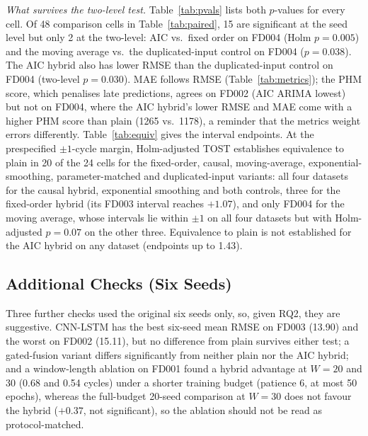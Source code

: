 \documentclass[conference]{IEEEtran}
\begin{document}
\emph{What survives the two-level test.} Table~\ref{tab:pvals} lists both $p$-values for every cell. Of 48 comparison cells in Table~\ref{tab:paired}, 15 are significant at the seed level but only 2 at the two-level: AIC vs.\ fixed order on FD004 (Holm $p=0.005$) and the moving average vs.\ the duplicated-input control on FD004 ($p=0.038$). The AIC hybrid also has lower RMSE than the duplicated-input control on FD004 (two-level $p=0.030$). MAE follows RMSE (Table~\ref{tab:metrics}); the PHM score, which penalises late predictions, agrees on FD002 (AIC ARIMA lowest) but not on FD004, where the AIC hybrid's lower RMSE and MAE come with a higher PHM score than plain (1265 vs.\ 1178), a reminder that the metrics weight errors differently. Table~\ref{tab:equiv} gives the interval endpoints. At the prespecified $\pm1$-cycle margin, Holm-adjusted TOST establishes equivalence to plain in 20 of the 24 cells for the fixed-order, causal, moving-average, exponential-smoothing, parameter-matched and duplicated-input variants: all four datasets for the causal hybrid, exponential smoothing and both controls, three for the fixed-order hybrid (its FD003 interval reaches $+1.07$), and only FD004 for the moving average, whose intervals lie within $\pm1$ on all four datasets but with Holm-adjusted $p=0.07$ on the other three. Equivalence to plain is not established for the AIC hybrid on any dataset (endpoints up to 1.43).


\subsection{Additional Checks (Six Seeds)}
Three further checks used the original six seeds only, so, given RQ2, they are suggestive. CNN-LSTM has the best six-seed mean RMSE on FD003 (13.90) and the worst on FD002 (15.11), but no difference from plain survives either test; a gated-fusion variant differs significantly from neither plain nor the AIC hybrid; and a window-length ablation on FD001 found a hybrid advantage at $W=20$ and $30$ (0.68 and 0.54 cycles) under a shorter training budget (patience 6, at most 50 epochs), whereas the full-budget 20-seed comparison at $W=30$ does not favour the hybrid ($+0.37$, not significant), so the ablation should not be read as protocol-matched.
\end{document}
